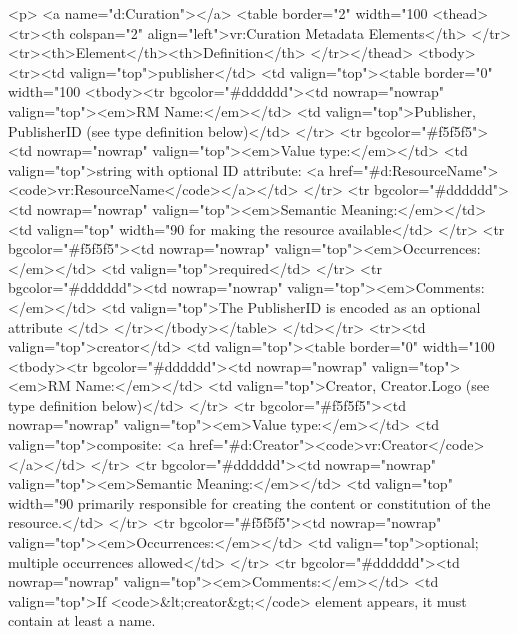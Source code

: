 \documentclass[11pt,a4paper]{ivoa}
\begin{document}
<p>
<a name="d:Curation"></a>
<table border="2" width="100%
<thead>
  <tr><th colspan="2" align="left">vr:Curation Metadata Elements</th>
  </tr><tr><th>Element</th><th>Definition</th>
</tr></thead>
<tbody>
  <tr><td valign="top">publisher</td>
      <td valign="top"><table border="0" width="100%
          <tbody><tr bgcolor="#dddddd"><td nowrap="nowrap" valign="top"><em>RM Name:</em></td>
              <td valign="top">Publisher, PublisherID (see type
definition below)</td>
          </tr>
          <tr bgcolor="#f5f5f5"><td nowrap="nowrap" valign="top"><em>Value type:</em></td>
              <td valign="top">string with optional ID attribute: <a href="#d:ResourceName"><code>vr:ResourceName</code></a></td>
          </tr>
          <tr bgcolor="#dddddd"><td nowrap="nowrap" valign="top"><em>Semantic Meaning:</em></td>
              <td valign="top" width="90%
                  for making the resource available</td> 
          </tr>
          <tr bgcolor="#f5f5f5"><td nowrap="nowrap" valign="top"><em>Occurrences:</em></td>
              <td valign="top">required</td>
          </tr>
          <tr bgcolor="#dddddd"><td nowrap="nowrap" valign="top"><em>Comments:</em></td>
              <td valign="top">The PublisherID is encoded as an optional
                  attribute </td> 
          </tr></tbody></table>
      </td></tr>
  <tr><td valign="top">creator</td>
      <td valign="top"><table border="0" width="100%
          <tbody><tr bgcolor="#dddddd"><td nowrap="nowrap" valign="top"><em>RM Name:</em></td>
              <td valign="top">Creator, Creator.Logo (see type definition below)</td>
          </tr>
          <tr bgcolor="#f5f5f5"><td nowrap="nowrap" valign="top"><em>Value type:</em></td>
              <td valign="top">composite: <a href="#d:Creator"><code>vr:Creator</code></a></td>
          </tr>
          <tr bgcolor="#dddddd"><td nowrap="nowrap" valign="top"><em>Semantic Meaning:</em></td>
              <td valign="top" width="90%
                  primarily responsible for creating the content or
                  constitution of the resource.</td> 
          </tr>
          <tr bgcolor="#f5f5f5"><td nowrap="nowrap" valign="top"><em>Occurrences:</em></td>
              <td valign="top">optional; multiple occurrences allowed</td>
          </tr>
          <tr bgcolor="#dddddd"><td nowrap="nowrap" valign="top"><em>Comments:</em></td>
              <td valign="top">If <code>&lt;creator&gt;</code>
                  element appears, it must contain at least a name.
\end{document}
